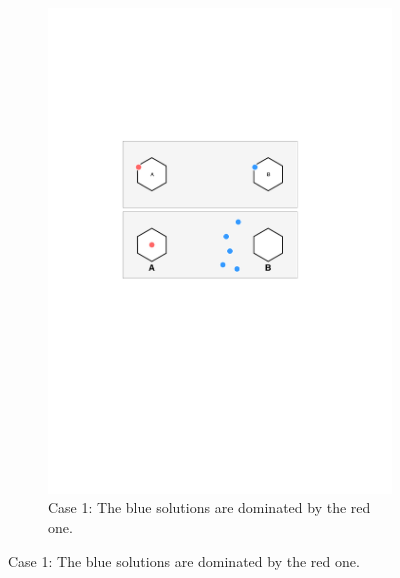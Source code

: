 \documentclass[conference]{IEEEtran}
\begin{document}
\begin{figure}[t!]
	\centering
	\begin{subfigure}[b]{.3\textwidth}
		\includegraphics[width=\linewidth]{Section3/case1}
		\caption{Case 1: The blue solutions are dominated by the red one.}
	\end{subfigure}
	

\end{figure}
\end{document}
